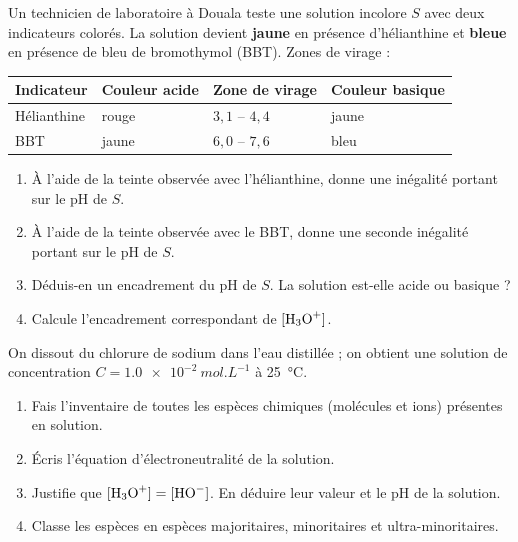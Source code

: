 \documentclass[11pt]{article}
\newcounter{popsec}
\newcounter{popsub}
\newcommand{\courssub}[1]{%
  \stepcounter{popsub}%
  \par\vspace{9pt}\noindent{\popxbold\fontsize{11.5}{13}\selectfont\color{popink}{\color{poporange}\thepopsec.\thepopsub}\hspace{6pt}#1}\par\nopagebreak\vspace{4pt}
}
\begin{document}
\begin{exercice}
Un technicien de laboratoire à Douala teste une solution incolore $S$ avec deux indicateurs colorés. La solution devient \textbf{jaune} en présence d'hélianthine et \textbf{bleue} en présence de bleu de bromothymol (BBT). Zones de virage :
\begin{center}
\begin{tabularx}{\linewidth}{|l|X|X|X|}
\hline
\rowcolor{popblueL} Indicateur & Couleur acide & Zone de virage & Couleur basique \\
\hline
Hélianthine & rouge & $3{,}1$ -- $4{,}4$ & jaune \\
\hline
BBT & jaune & $6{,}0$ -- $7{,}6$ & bleu \\
\hline
\end{tabularx}
\end{center}
\begin{enumerate}
\item À l'aide de la teinte observée avec l'hélianthine, donne une inégalité portant sur le pH de $S$.
\item À l'aide de la teinte observée avec le BBT, donne une seconde inégalité portant sur le pH de $S$.
\item Déduis-en un encadrement du pH de $S$. La solution est-elle acide ou basique ?
\item Calcule l'encadrement correspondant de $[\ce{H3O+}]$.
\end{enumerate}
\end{exercice}

\begin{exercice}
On dissout du chlorure de sodium  dans l'eau distillée ; on obtient une solution de concentration $C = \SI{1,0e-2}{mol.L^{-1}}$ à \SI{25}{\celsius}.
\begin{enumerate}
\item Fais l'inventaire de toutes les espèces chimiques (molécules et ions) présentes en solution.
\item Écris l'équation d'électroneutralité de la solution.
\item Justifie que $[\ce{H3O+}] = [\ce{HO-}]$. En déduire leur valeur et le pH de la solution.
\item Classe les espèces en espèces majoritaires, minoritaires et ultra-minoritaires.
\end{enumerate}
\end{exercice}

\courssub{Je me prépare au Bac}
\end{document}

